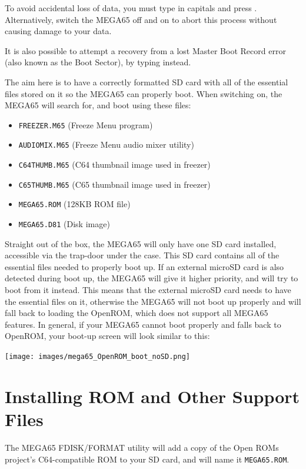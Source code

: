 To avoid accidental loss of data, you must type  in capitals and press . Alternatively, switch the MEGA65 off and on to abort this process without causing damage to your data.

It is also possible to attempt a recovery from a lost Master Boot Record error (also known as the Boot Sector), by typing  instead.

The aim here is to have a correctly formatted SD card with all of the essential files stored on it so the MEGA65 can properly boot.
When switching on, the MEGA65 will search for, and boot using these files:
\begin{itemize}
\item {\tt FREEZER.M65} (Freeze Menu program)
\item {\tt AUDIOMIX.M65} (Freeze Menu audio mixer utility)
\item {\tt C64THUMB.M65} (C64 thumbnail image used in freezer)
\item {\tt C65THUMB.M65} (C65 thumbnail image used in freezer)
\item {\tt MEGA65.ROM}   (128KB ROM file)
\item {\tt MEGA65.D81} (Disk image)
\end{itemize}

Straight out of the box, the MEGA65 will only have one SD card installed, accessible via the trap-door under the case. This SD card contains all of the essential files needed to properly boot up.
If an external microSD card is also detected during boot up, the MEGA65 will give it higher priority, and will try to boot from it instead.
This means that the external microSD card needs to have the essential files on it, otherwise the MEGA65 will not boot up properly and will fall back to loading the OpenROM, which does not support all MEGA65 features.
In general, if your MEGA65 cannot boot properly and falls back to OpenROM, your boot-up screen will look similar to this:

\begin{center}
\texttt{[image: images/mega65\_OpenROM\_boot\_noSD.png]}
\end{center}


\section{Installing ROM and Other Support Files}
\label{sec:installingrometc}

The MEGA65 FDISK/FORMAT utility will add a copy of the Open ROMs project's C64-compatible ROM
to your SD card, and will name it {\tt MEGA65.ROM}.

